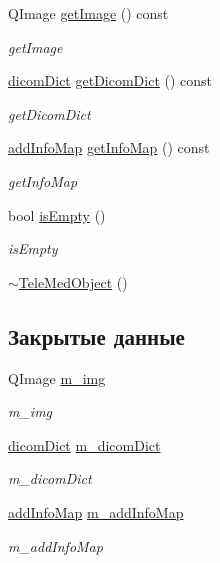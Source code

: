 \begin{DoxyCompactItemize}
Q\+Image \hyperlink{classTeleMedObject_a69c34b50bb901268d193bbbb7a7698c5}{get\+Image} () const
\begin{DoxyCompactList}\small\item\em get\+Image \end{DoxyCompactList}\item 
\hyperlink{tagshelpers_8h_ae25d30658f61420b88a380dc9e40bb74}{dicom\+Dict} \hyperlink{classTeleMedObject_a66119d8882d0e8319d337a559bfa78a3}{get\+Dicom\+Dict} () const
\begin{DoxyCompactList}\small\item\em get\+Dicom\+Dict \end{DoxyCompactList}\item 
\hyperlink{dbform_8h_a1ec1a645f41e1c6544d384ca863a936c}{add\+Info\+Map} \hyperlink{classTeleMedObject_a56def4aa26d190a557014d9a3d99099f}{get\+Info\+Map} () const
\begin{DoxyCompactList}\small\item\em get\+Info\+Map \end{DoxyCompactList}\item 
bool \hyperlink{classTeleMedObject_a651ae9fa2690217a8327d194682ef60c}{is\+Empty} ()
\begin{DoxyCompactList}\small\item\em is\+Empty \end{DoxyCompactList}\item 
\hyperlink{classTeleMedObject_a6d60cc13e1b1812938cb9a7277c49d43}{$\sim$\+Tele\+Med\+Object} ()
\end{DoxyCompactItemize}
\subsection*{Закрытые данные}
\begin{DoxyCompactItemize}
\item 
Q\+Image \hyperlink{classTeleMedObject_a4ea4fc9f1c9e7f7e7760b1c7db163789}{m\+\_\+img}
\begin{DoxyCompactList}\small\item\em m\+\_\+img \end{DoxyCompactList}\item 
\hyperlink{tagshelpers_8h_ae25d30658f61420b88a380dc9e40bb74}{dicom\+Dict} \hyperlink{classTeleMedObject_a15a8c04c55623d826a04908a949fce31}{m\+\_\+dicom\+Dict}
\begin{DoxyCompactList}\small\item\em m\+\_\+dicom\+Dict \end{DoxyCompactList}\item 
\hyperlink{dbform_8h_a1ec1a645f41e1c6544d384ca863a936c}{add\+Info\+Map} \hyperlink{classTeleMedObject_a812a8fdb794711a94a9fc0fa4f1de27e}{m\+\_\+add\+Info\+Map}
\begin{DoxyCompactList}\small\item\em m\+\_\+add\+Info\+Map \end{DoxyCompactList}\end{DoxyCompactItemize}


